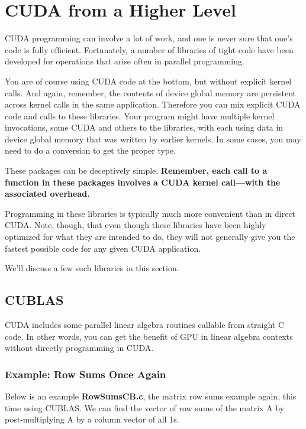 \section{CUDA from a Higher Level}

CUDA programming can involve a lot of work, and one is never sure that
one's code is fully efficient.  Fortunately, a number of libraries of
tight code have been developed for operations that arise often in
parallel programming.  

You are of course using CUDA code at the bottom, but without explicit
kernel calls.  And again, remember, the contents of device global memory
are persistent across kernel calls in the same application.  Therefore
you can mix explicit CUDA code and calls to these libraries.  Your
program might have multiple kernel invocations, some CUDA and others to
the libraries, with each using data in device global memory that was
written by earlier kernels.  In some cases, you may need to do a
conversion to get the proper type.

These packages can be deceptively simple.  {\bf Remember, each call to a
function in these packages involves a CUDA kernel call---with the
associated overhead.}

Programming in these libraries is typically much more convenient than in
direct CUDA.  Note, though, that even though these libraries have been
highly optimized for what they are intended to do, they will not
generally give you the fastest possible code for any given CUDA
application.  

We'll discuss a few such libraries in this section.

\subsection{CUBLAS}
\label{cublas}

CUDA includes some parallel linear algebra routines callable from
straight C code.  In other words, you can get the benefit of GPU in
linear algebra contexts without directly programming in CUDA.

\subsubsection{Example:  Row Sums Once Again}

Below is an example {\bf RowSumsCB.c}, the matrix row sums example
again, this time using CUBLAS.  We can find the vector of row sums of
the matrix A by post-multiplying A by a column vector of all 1s.

